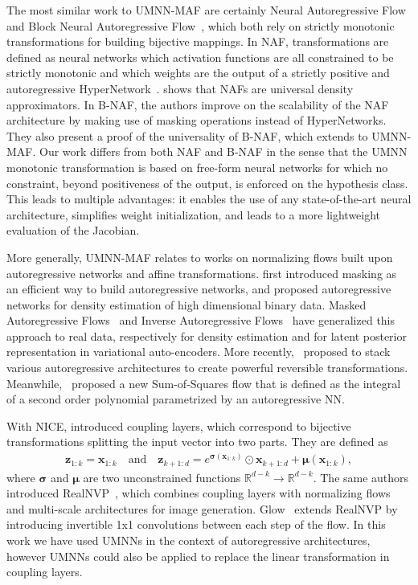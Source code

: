 \documentclass{article}
\newcommand{\mb}{\boldsymbol}
\newcommand{\mbb}{\mathbb}
\begin{document}
The most similar work to UMNN-MAF are certainly Neural Autoregressive Flow~\citep[NAF, ][]{NAF} and Block Neural Autoregressive Flow~\citep[B-NAF, ][]{BNAF}, which both rely on strictly monotonic transformations for building bijective mappings.
In NAF, transformations are defined as neural networks which activation functions are all constrained to be strictly monotonic and which weights are the output of a strictly positive and autoregressive HyperNetwork~\citep{hypernetworks}.
\cite{NAF} shows that NAFs are universal density approximators.
In B-NAF, the authors improve on the scalability of the NAF architecture by making use of masking operations instead of HyperNetworks. They also present a proof of the universality of B-NAF, which extends to UMNN-MAF.
Our work differs from both NAF and B-NAF in the sense that the UMNN monotonic transformation is based on free-form neural networks for which no constraint,  beyond positiveness of the output, is enforced on the hypothesis class.
This leads to multiple advantages: it enables the use of any state-of-the-art neural architecture, simplifies weight initialization, and leads to a more lightweight evaluation of the Jacobian.

More generally, UMNN-MAF relates to works on normalizing flows built upon autoregressive networks and affine transformations.
\cite{MADE} first introduced masking as an efficient way to build autoregressive networks, and proposed autoregressive networks for density estimation of high dimensional binary data.
Masked Autoregressive Flows~\citep{MAF} and Inverse Autoregressive Flows~\citep{IAF} have generalized this approach to real data, respectively for density estimation and for latent posterior representation in variational auto-encoders.
More recently, \cite{TAN}~proposed to stack various autoregressive architectures to create powerful reversible transformations. Meanwhile, \cite{sos}~proposed a new Sum-of-Squares flow that is defined as the integral of a second order polynomial parametrized by an autoregressive NN.

With NICE, \cite{NICE} introduced coupling layers, which correspond to bijective transformations splitting the input vector into two parts. They are defined as
\begin{align}
    \mb{z}_{1:k} = \mb{x}_{1:k}\quad \text{and}\quad
    \mb{z}_{k+1:d} = e^{\mb{\sigma}(\mb{x}_{1:k})} \odot	 \mb{x}_{k+1:d} + \mb{\mu}(\mb{x}_{1:k}),
\end{align}
where $\mb{\sigma}$ and $\mb{\mu}$ are two unconstrained functions $\mbb{R}^{d-k} \rightarrow \mbb{R}^{d-k}$.
The same authors introduced RealNVP~\citep{RealNVP}, which combines coupling layers with normalizing flows and multi-scale architectures for image generation.
Glow~\citep{GLOW} extends RealNVP by introducing invertible 1x1 convolutions between each step of the flow.
In this work we have used UMNNs in the context of autoregressive architectures, however UMNNs could also be applied to replace the linear transformation in coupling layers.
\end{document}
